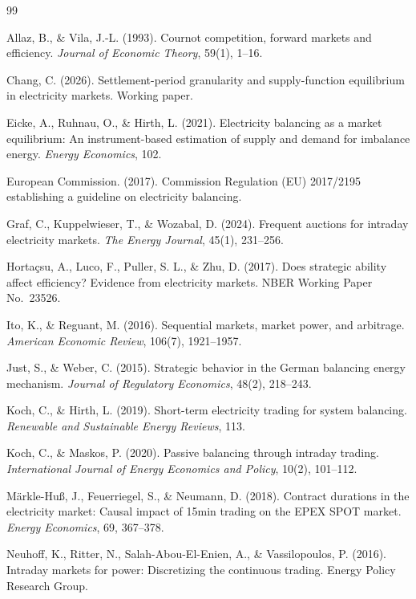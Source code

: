 \documentclass[11pt,a4paper]{article}
\begin{document}
\begin{thebibliography}{99}\small

 Allaz, B., \& Vila, J.-L. (1993). Cournot competition, forward markets and efficiency. \textit{Journal of Economic Theory}, 59(1), 1--16.

 Chang, C. (2026). Settlement-period granularity and supply-function equilibrium in electricity markets. Working paper.

 Eicke, A., Ruhnau, O., \& Hirth, L. (2021). Electricity balancing as a market equilibrium: An instrument-based estimation of supply and demand for imbalance energy. \textit{Energy Economics}, 102.

 European Commission. (2017). Commission Regulation (EU) 2017/2195 establishing a guideline on electricity balancing.

 Graf, C., Kuppelwieser, T., \& Wozabal, D. (2024). Frequent auctions for intraday electricity markets. \textit{The Energy Journal}, 45(1), 231--256.

 Hortaçsu, A., Luco, F., Puller, S. L., \& Zhu, D. (2017). Does strategic ability affect efficiency? Evidence from electricity markets. NBER Working Paper No.~23526.

 Ito, K., \& Reguant, M. (2016). Sequential markets, market power, and arbitrage. \textit{American Economic Review}, 106(7), 1921--1957.

 Just, S., \& Weber, C. (2015). Strategic behavior in the German balancing energy mechanism. \textit{Journal of Regulatory Economics}, 48(2), 218--243.

 Koch, C., \& Hirth, L. (2019). Short-term electricity trading for system balancing. \textit{Renewable and Sustainable Energy Reviews}, 113.

 Koch, C., \& Maskos, P. (2020). Passive balancing through intraday trading. \textit{International Journal of Energy Economics and Policy}, 10(2), 101--112.

 Märkle-Huß, J., Feuerriegel, S., \& Neumann, D. (2018). Contract durations in the electricity market: Causal impact of 15min trading on the EPEX SPOT market. \textit{Energy Economics}, 69, 367--378.

 Neuhoff, K., Ritter, N., Salah-Abou-El-Enien, A., \& Vassilopoulos, P. (2016). Intraday markets for power: Discretizing the continuous trading. Energy Policy Research Group.

\end{thebibliography}
\end{document}
